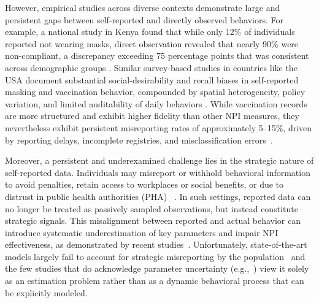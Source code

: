 \documentclass[sigconf,review]{acmart}
\begin{document}
However, empirical studies across diverse contexts demonstrate large and persistent gaps between self-reported and directly observed behaviors. For example, a national study in Kenya found that while only 12\% of individuals reported not wearing masks, direct observation revealed that nearly 90\% were non-compliant, a discrepancy exceeding 75 percentage points that was consistent across demographic groups \cite{kenya2021}. Similar survey-based studies in countries like the USA document substantial social-desirability and recall biases in self-reported masking and vaccination behavior, compounded by spatial heterogeneity, policy variation, and limited auditability of daily behaviors \cite{spatiotemporal}. While vaccination records are more structured and exhibit higher fidelity than other NPI measures, they nevertheless exhibit persistent misreporting rates of approximately 5--15\%, driven by reporting delays, incomplete registries, and misclassification errors~\cite{HURLEY2026128101,DALEY20242740,IRVING20096546}.

Moreover, a persistent and underexamined challenge lies in the strategic nature of self-reported data. Individuals may misreport or withhold behavioral information to avoid penalties, retain access to workplaces or social benefits, or due to distrust in public health authorities (PHA) ~\cite{levy2022,shiman2023}.  
In such settings, reported data 
can no longer be treated as passively sampled observations, but instead constitute strategic signals.
This misalignment between reported and actual behavior can introduce systematic underestimation of key parameters and impair NPI effectiveness, as demonstrated by recent studies~\cite{WuNature2020,PullanoNature2021,MilanesiArxiv2023}. Unfortunately, state-of-the-art models largely fail to account for strategic misreporting by the population~\cite{PatelJTB2005} %
and the few studies that do acknowledge parameter uncertainty
(e.g.,~\cite{TannerMB2018}) 
view it solely as an estimation problem rather than as a dynamic behavioral process that can be explicitly modeled.

\end{document}
